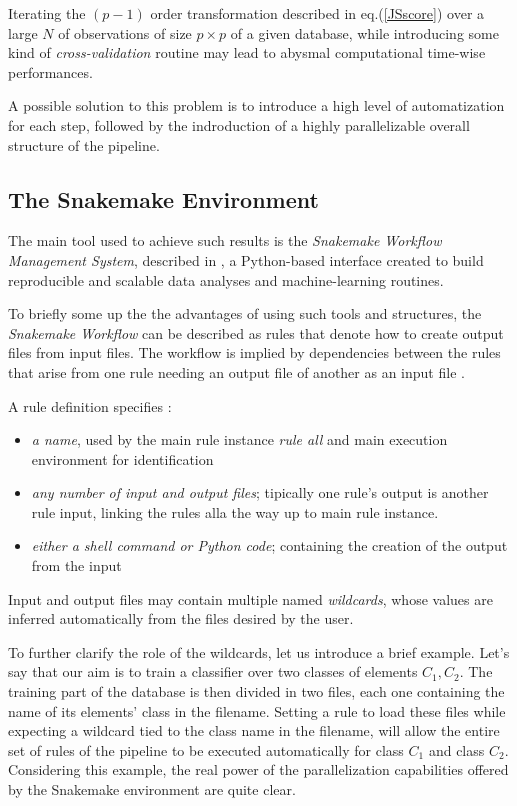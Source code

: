 \documentclass[12pt,openright,twoside,a4paper]{book}
\begin{document}
Iterating the $(p-1)$ order transformation described in eq.(\ref{JSscore}) over a large $N$ of observations of size $	p \times p$ of a given database, while introducing some kind of \textit{cross-validation} routine may lead to abysmal computational time-wise performances.

A possible solution to this problem is to introduce a high level of automatization for each step, followed by the indroduction of a highly parallelizable overall structure of the pipeline.

\subsection{The Snakemake Environment}

The main tool used to achieve such results is the \textit{ Snakemake Workflow Management System}, described in \cite{SnakeMake}, a Python-based interface created to build reproducible and scalable data analyses and machine-learning routines.

To briefly some up the the advantages of using such tools and structures, the \textit{Snakemake Workflow} can be described as rules that denote how to create output files from input files. The workflow is implied by dependencies between the rules that arise from one rule needing an output file of another as an input file \cite{SnakeMake}.

A rule definition specifies :

\begin{itemize}
\item \textit{a name}, used by the main rule instance \textit{rule all} and main execution environment for identification
\item \textit{any number of input and output files}; tipically one rule's output is another rule input, linking the rules alla the way up to main rule instance.
\item  \textit{either a shell command or Python code}; containing the creation of the output from the input
\end{itemize} 
Input and output files may contain multiple named \textit{wildcards}, whose values are inferred automatically from the files desired by the user.

To further clarify the role of the wildcards, let us introduce a brief example.
Let's say that our aim is to train a classifier over two classes of elements $C_1,C_2$. The training part of the database is then divided in two files, each one containing the name of its elements' class in the filename.
Setting a rule to load these files while expecting a wildcard tied to the class name in the filename, will allow the entire set of rules of the pipeline to be executed automatically for class $C_1$ and class $C_2$.
Considering this example, the real power of the parallelization capabilities offered by the Snakemake environment are quite clear.
\end{document}
